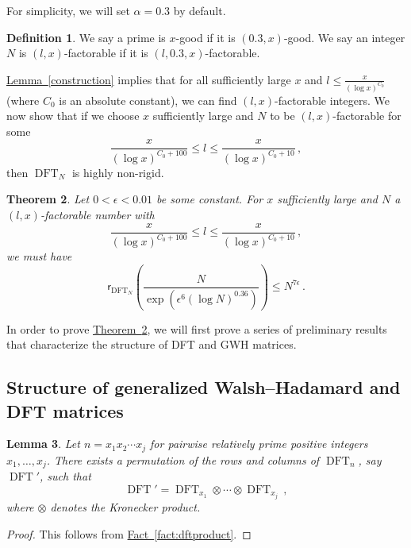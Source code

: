 \documentclass[11pt]{article}
\numberwithin{equation}{section}
\newtheorem{theorem}{Theorem}[section]
\newtheorem{lemma}[theorem]{Lemma}
\theoremstyle{definition}
\theoremstyle{plain}
\newcommand{\expref}[2]{\hyperref[#2]{#1~\ref{#2}}}
\theoremstyle{definition}
\newtheorem{define}[theorem]{Definition}
\DeclareMathOperator{\DFT}{DFT}
\begin{document}
For simplicity, we will set $\alpha = 0.3$ by default. 
\begin{define}
%
We say a prime is $x$-good %
if it is $(0.3,x)$-good.  %
We say an integer $N$ is %
 $(l,x)$-factorable if it is $(l, 0.3, x)$-factorable.
\end{define}  

\expref{Lemma}{construction} implies that for all sufficiently large $x$ and $l \leq \frac{x}{(\log x)^{C_0}}$ (where $C_0$ is an absolute constant), we can find $(l,x)$-factorable integers.  We now show that if we choose $x$ sufficiently large and $N$ to be $(l,x)$-factorable for some 
\[
\frac{x}{(\log x)^{C_0 + 100}} \leq l \leq\frac{x}{(\log x)^{C_0 + 10}} \,, \]
 then %
$\DFT_N$ %
 is highly non-rigid.  


\begin{theorem} \label{main}
Let $0 <\epsilon < 0.01$ be some constant.  For $x$ sufficiently large and $N$ a $(l, x)$-factorable number with \[\frac{x}{(\log x)^{C_0 + 100}} \leq l \leq\frac{x}{(\log x)^{C_0 + 10}}\,, \] we must have
%
%
%
%
\[
\textsf{r}_{\DFT_N}\left( \frac{N}{\exp\left(\epsilon^6 (\log N)^{0.36}\right)} \right) \leq N^{ 7 \epsilon} \,.
\]
%
\end{theorem}

In order to prove \expref{Theorem}{main}, we will first prove a series of preliminary results that characterize the structure of %
DFT %
 and 
%
GWH matrices.   %

%
\subsection{Structure of generalized Walsh--Hadamard and %
DFT %
 matrices}

\begin{lemma}\label{decomp}
Let $n = x_1x_2\cdots x_j$ for pairwise relatively prime positive integers $x_1, \dots , x_j$. There exists a permutation of the rows and columns of
$\DFT_n$, say $\DFT'$, such that 
\[
\DFT' = \DFT_{x_1} \otimes \cdots \otimes \DFT_{x_j}\,,
\]
where $\otimes$ denotes the Kronecker product.
\end{lemma}
\begin{proof}
This follows from \expref{Fact}{fact:dftproduct}.
\end{proof}
\end{document}
